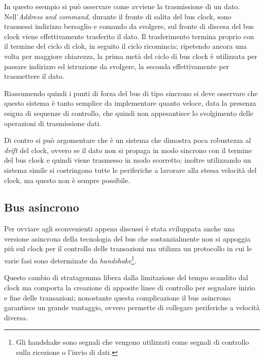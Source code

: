 \documentclass[class=book, crop=false, oneside]{standalone}
\begin{document}
In questo esempio si può osservare come avviene la trasmissione di un dato.
Nell'\emph{Address and command}, durante il fronte di salita del bus clock, sono trasmessi indirizzo bersaglio e comando da svolgere, sul fronte di discesa del bus clock viene effettivamente trasferito il dato.
Il trasferimento termina proprio con il termine del ciclo di clok, in seguito il ciclo ricomincia; ripetendo ancora una volta per maggiore chiarezza, la prima metà del ciclo di bus clock è utilizzata per passare indirizzo ed istruzione da svolgere, la seconda effettivamente per trasmettere il dato.

Riassumendo quindi i punti di forza del bus di tipo sincrono si deve osservare che questo sistema è tanto semplice da implementare quanto veloce, data la presenza esigua di sequenze di controllo, che quindi non appesantisce lo svolgimento delle operazioni di trasmissione dati.

Di contro si può argomentare che è un sistema che dimostra poca robustezza al \emph{drift} del clock, ovvero se il dato non si propaga in modo sincrono con il  termine del bus clock e quindi viene trasmesso in modo scorretto; inoltre utilizzando un sistema simile si costringono tutte le periferiche a lavorare alla stessa velocità del clock, ma questo non è sempre possibile.

\subsection{Bus asincrono}
Per ovviare agli sconvenienti appena discussi è stata sviluppata anche una versione asincrona della tecnologia del bus che sostanzialmente non si appoggia più sul clock per il controllo delle transazioni ma utilizza un protocollo in cui le varie fasi sono determinate da \emph{handshake}\footnote{Gli handshake sono segnali che vengono utilizzati come segnali di controllo sulla ricezione o l'invio di dati.}.

Questo cambio di stratagemma libera dalla limitazione del tempo scandito dal clock ma comporta la creazione di apposite linee di controllo per segnalare inizio e fine delle transazioni;
nonostante questa complicazione il bus asincrono garantisce un grande vantaggio, ovvero permette di collegare periferiche a velocità diversa.
\end{document}
